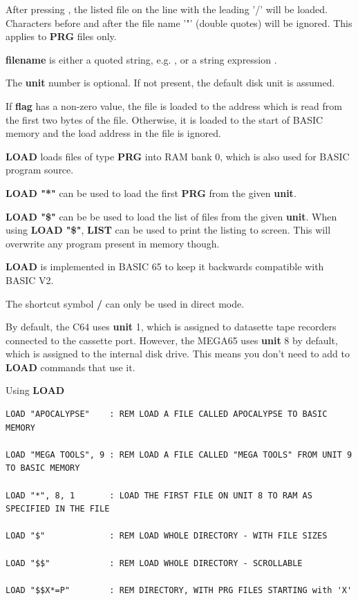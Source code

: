 \begin{description}[leftmargin=2cm,style=nextline]
                  After pressing , the listed file on the line with the leading '/' will be loaded. Characters before and after the file name '"' (double quotes) will be ignored. This applies to {\bf PRG} files only.

                  {\bf filename} is either a quoted string, e.g. , or a string expression .

                  The {\bf unit} number is optional. If not present, the default disk unit is assumed.

                  If {\bf flag} has a non-zero value, the file is loaded to the address which is read from the first two bytes of the file. Otherwise, it is loaded to the start of BASIC memory and the load address in the file is ignored.

\item [Remarks:]  {\bf LOAD} loads files of type {\bf PRG} into RAM bank 0, which is also used for BASIC program source.

                  {\bf LOAD "*"} can be used to load the first {\bf PRG} from the given {\bf unit}.

                  {\bf LOAD "\$"} can be be used to load the list of files from the given {\bf unit}. When using {\bf LOAD "\$"}, {\bf LIST} can be used to print the listing to screen. This will overwrite any program present in memory though.

                  {\bf LOAD} is implemented in BASIC 65 to keep it backwards compatible with BASIC V2.

                  The shortcut symbol {\bf /} can only be used in direct mode.

                  By default, the C64 uses {\bf unit} 1, which is assigned to datasette tape recorders connected to the cassette port. However, the MEGA65 uses {\bf unit} 8 by default, which is assigned to the internal disk drive. This means you don't need to add  to {\bf LOAD} commands that use it.

\item [Examples:] Using {\bf LOAD}

\begin{tcolorbox}[colback=black,coltext=white]
\verbatimfont{\codefont}
\begin{verbatim}
LOAD "APOCALYPSE"    : REM LOAD A FILE CALLED APOCALYPSE TO BASIC MEMORY

LOAD "MEGA TOOLS", 9 : REM LOAD A FILE CALLED "MEGA TOOLS" FROM UNIT 9 TO BASIC MEMORY

LOAD "*", 8, 1       : LOAD THE FIRST FILE ON UNIT 8 TO RAM AS SPECIFIED IN THE FILE

LOAD "$"             : REM LOAD WHOLE DIRECTORY - WITH FILE SIZES

LOAD "$$"            : REM LOAD WHOLE DIRECTORY - SCROLLABLE

LOAD "$$X*=P"        : REM DIRECTORY, WITH PRG FILES STARTING with 'X'
\end{verbatim}
\end{tcolorbox}
\end{description}

